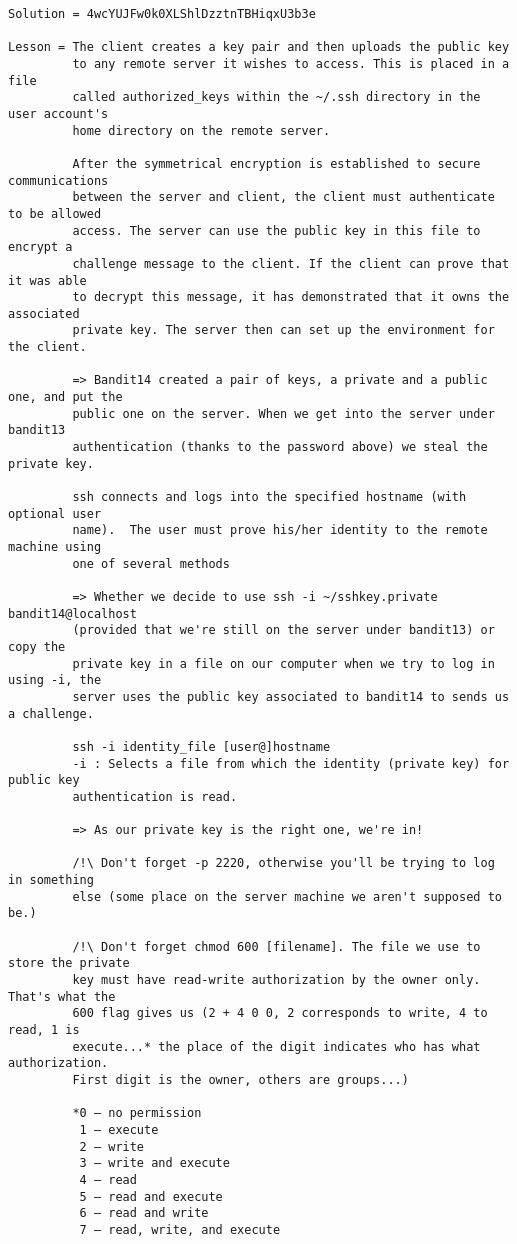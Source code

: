 \documentclass[a4paper]{report}
\begin{document}
\begin{verbatim}
Solution = 4wcYUJFw0k0XLShlDzztnTBHiqxU3b3e

Lesson = The client creates a key pair and then uploads the public key 
		 to any remote server it wishes to access. This is placed in a file 
		 called authorized_keys within the ~/.ssh directory in the user account's
		 home directory on the remote server.

		 After the symmetrical encryption is established to secure communications 
		 between the server and client, the client must authenticate to be allowed 
		 access. The server can use the public key in this file to encrypt a 
		 challenge message to the client. If the client can prove that it was able 
		 to decrypt this message, it has demonstrated that it owns the associated 
		 private key. The server then can set up the environment for the client.

		 => Bandit14 created a pair of keys, a private and a public one, and put the
		 public one on the server. When we get into the server under bandit13
		 authentication (thanks to the password above) we steal the private key.

		 ssh connects and logs into the specified hostname (with optional user
		 name).  The user must prove his/her identity to the remote machine using
		 one of several methods

		 => Whether we decide to use ssh -i ~/sshkey.private bandit14@localhost
		 (provided that we're still on the server under bandit13) or copy the
		 private key in a file on our computer when we try to log in using -i, the
		 server uses the public key associated to bandit14 to sends us a challenge. 

		 ssh -i identity_file [user@]hostname
		 -i : Selects a file from which the identity (private key) for public key
		 authentication is read.

		 => As our private key is the right one, we're in!

		 /!\ Don't forget -p 2220, otherwise you'll be trying to log in something
		 else (some place on the server machine we aren't supposed to be.)
		 
		 /!\ Don't forget chmod 600 [filename]. The file we use to store the private
		 key must have read-write authorization by the owner only. That's what the
		 600 flag gives us (2 + 4 0 0, 2 corresponds to write, 4 to read, 1 is
		 execute...* the place of the digit indicates who has what authorization.
		 First digit is the owner, others are groups...)

		 *0 – no permission
		  1 – execute
		  2 – write
		  3 – write and execute
		  4 – read
		  5 – read and execute
		  6 – read and write
		  7 – read, write, and execute
\end{verbatim}
\end{document}
